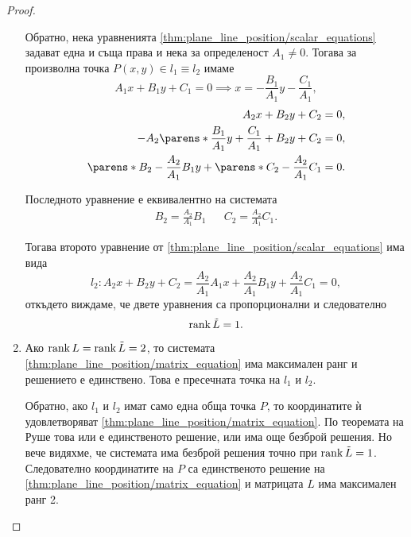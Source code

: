 \documentclass{../../common/topic}
\begin{document}
\begin{proof}
\begin{enumerate}
    Обратно, нека уравненията \eqref{thm:plane_line_position/scalar_equations} задават една и съща права и нека за определеност \( A_1 \neq 0 \). Тогава за произволна точка \( P(x, y) \in l_1 \equiv l_2 \) имаме
    \begin{equation*}
      A_1x + B_1y + C_1 = 0
      \implies
      x = - \frac {B_1} {A_1} y - \frac {C_1} {A_1},
    \end{equation*}
    \begin{align*}
      A_2x + B_2y + C_2 &= 0,
      \\
      - A_2 \parens*{\frac {B_1} {A_1} y + \frac {C_1} {A_1} } + B_2y + C_2 &= 0,
      \\
      \parens*{B_2 - \frac {A_2} {A_1} B_1 } y + \parens*{C_2 - \frac {A_2} {A_1} C_1 } &= 0.
    \end{align*}

    Последното уравнение е еквивалентно на системата
    \begin{align*}
      B_2 = \frac {A_2} {A_1} B_1
      &&
      C_2 = \frac {A_2} {A_1} C_1.
    \end{align*}

    Тогава второто уравнение от \eqref{thm:plane_line_position/scalar_equations} има вида
    \begin{equation*}
      l_2:
      A_2 x + B_2 y + C_2 =
      \frac {A_2} {A_1} A_1 x + \frac {A_2} {A_1} B_1 y + \frac {A_2} {A_1} C_1
      = 0,
    \end{equation*}
    откъдето виждаме, че двете уравнения са пропорционални и следователно
    \begin{equation*}
      \operatorname{rank} \tilde L = 1.
    \end{equation*}

    \item Ако \( \operatorname{rank} L = \operatorname{rank} \tilde L = 2 \), то системата \eqref{thm:plane_line_position/matrix_equation} има максимален ранг и решението е единствено. Това е пресечната точка на \( l_1 \) и \( l_2 \).

    Обратно, ако \( l_1 \) и \( l_2 \) имат само една обща точка \( P \), то координатите ѝ удовлетворяват \eqref{thm:plane_line_position/matrix_equation}. По теоремата на Руше това или е единственото решение, или има още безброй решения. Но вече видяхме, че системата има безброй решения точно при \( \operatorname{rank} \tilde L = 1 \). Следователно координатите на \( P \) са единственото решение на \eqref{thm:plane_line_position/matrix_equation} и матрицата \( L \) има максимален ранг 2.
  \end{enumerate}
\end{proof}
\end{document}
